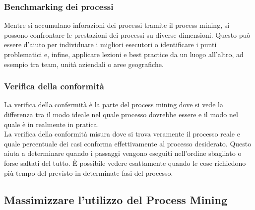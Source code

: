 \documentclass{article}
\begin{document}
\subsubsection{Benchmarking dei processi}
Mentre si accumulano inforazioni dei processi tramite il process mining, si possono confrontare le prestazioni dei processi su diverse dimensioni. Questo può essere d'aiuto per individuare i migliori esecutori o identificare i punti problematici e, infine, applicare lezioni e best practice da un luogo all'altro, ad esempio tra team, unità aziendali o aree geografiche.
\subsubsection{Verifica della conformità}
La verifica della confermità è la parte del process mining dove si vede la differenza tra il modo ideale nel quale processo dovrebbe essere e il modo nel quale è in realmente in pratica.\\
La verifica della conformità misura dove si trova veramente il processo reale e quale percentuale dei casi conforma effettivamente al processo desiderato. Questo aiuta a determinare quando i passaggi vengono eseguiti nell'ordine sbagliato o forse saltati del tutto. È possibile vedere esattamente quando le cose richiedono più tempo del previsto in determinate fasi del processo.

\subsection{Massimizzare l'utilizzo del Process Mining}
\end{document}
